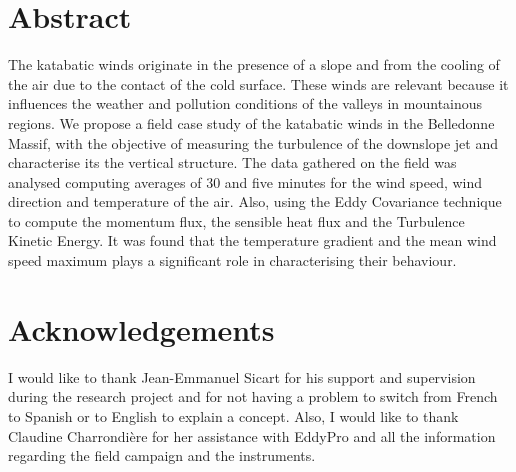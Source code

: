 \documentclass[english, a4paper, 12pt, twoside]{report}
\begin{document}
\linespread{1.5}

\restoregeometry %

\thispagestyle{plain} %
\clearpage\mbox{}\clearpage %

\newpage
\linespread{1.25}
\section*{Abstract} 
The katabatic winds originate in the presence of a slope and from the cooling of the air due to the contact of the cold surface. These winds are relevant because it influences the weather and pollution conditions of the valleys in mountainous regions. We propose a field case study of the katabatic winds in the Belledonne Massif, with the objective of measuring the turbulence of the downslope jet and characterise its the vertical structure. The data gathered on the field was analysed computing averages of 30 and five minutes for the wind speed, wind direction and temperature of the air. Also, using the Eddy Covariance technique to compute the momentum flux, the sensible heat flux and the Turbulence Kinetic Energy. It was found that the temperature gradient and the mean wind speed maximum plays a significant role in characterising their behaviour.


\newpage

\section*{Acknowledgements}

I would like to thank Jean-Emmanuel Sicart for his support and supervision during the research project and for not having a problem to switch from French to Spanish or to English to explain a concept. Also, I would like to thank Claudine Charrondi\`ere for her assistance with EddyPro and all the information regarding the field campaign and the instruments.
\end{document}
